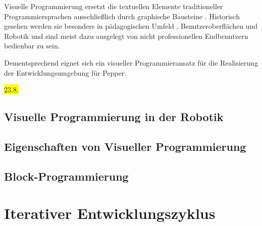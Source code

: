 Visuelle Programmierung ersetzt die textuellen Elemente traditioneller Programmiersprachen ausschließlich durch graphische Bausteine \cite{Schiffer1996VisuelleProgPG}. Historisch gesehen werden sie besonders in pädagogischen Umfeld \cite{SaezLopez2016VPLElementarySchool}, Benutzeroberflächen \cite{Rode2005EUDWebDev} und Robotik \cite{Weintrop2018CoBloxRoboticsProg} und sind meist dazu ausgelegt von nicht professionellen Endbenutzern bedienbar zu sein.

Dementsprechend eignet sich ein visueller Programmieransatz für die Realisierung der Entwicklungsumgebung für Pepper.

\colorbox{yellow}{23.8.}

\subsection{Visuelle Programmierung in der Robotik}

\subsection{Eigenschaften von Visueller Programmierung}

\subsection{Block-Programmierung} 

\section{Iterativer Entwicklungszyklus} \label{sec:iterative-entwicklung} %